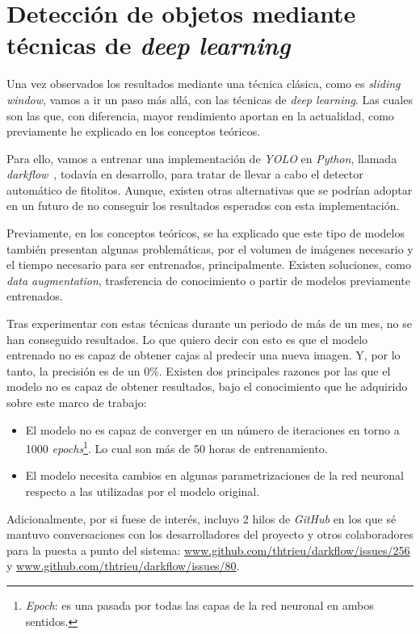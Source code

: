 \section{Detección de objetos mediante técnicas de \textit{deep learning}}

Una vez observados los resultados mediante una técnica clásica, como es \textit{sliding window}, vamos a ir un paso más allá, con las técnicas de \textit{deep learning}. Las cuales son las que, con diferencia, mayor rendimiento aportan en la actualidad, como previamente he explicado en los conceptos teóricos.

Para ello, vamos a entrenar una implementación de \textit{YOLO} en \textit{Python}, llamada \textit{darkflow}~\cite{darkflow}, todavía en desarrollo, para tratar de llevar a cabo el detector automático de fitolitos. Aunque, existen otras alternativas que se podrían adoptar en un futuro de no conseguir los resultados esperados con esta implementación.

Previamente, en los conceptos teóricos, se ha explicado que este tipo de modelos también presentan algunas problemáticas, por el volumen de imágenes necesario y el tiempo necesario para ser entrenados, principalmente. Existen soluciones, como \textit{data augmentation}, trasferencia de conocimiento o partir de modelos previamente entrenados.

Tras experimentar con estas técnicas durante un periodo de más de un mes, no se han conseguido resultados. Lo que quiero decir con esto es que el modelo entrenado no es capaz de obtener cajas al predecir una nueva imagen. Y, por lo tanto, la precisión es de un 0\%. Existen dos principales razones por las que el modelo no es capaz de obtener resultados, bajo el conocimiento que he adquirido sobre este marco de trabajo:

\begin{itemize}
	\item El modelo no es capaz de converger en un número de iteraciones en torno a 1000 \textit{epochs}\footnote{\textit{Epoch}: es una pasada por todas las capas de la red neuronal en ambos sentidos.}. Lo cual son más de 50 horas de entrenamiento.
	\item El modelo necesita cambios en algunas parametrizaciones de la red neuronal respecto a las utilizadas por el modelo original.
\end{itemize}

Adicionalmente, por si fuese de interés, incluyo 2 hilos de \textit{GitHub} en los que sé mantuvo conversaciones con los desarrolladores del proyecto y otros colaboradores para la puesta a punto del sistema: \url{www.github.com/thtrieu/darkflow/issues/256} y \url{www.github.com/thtrieu/darkflow/issues/80}.

